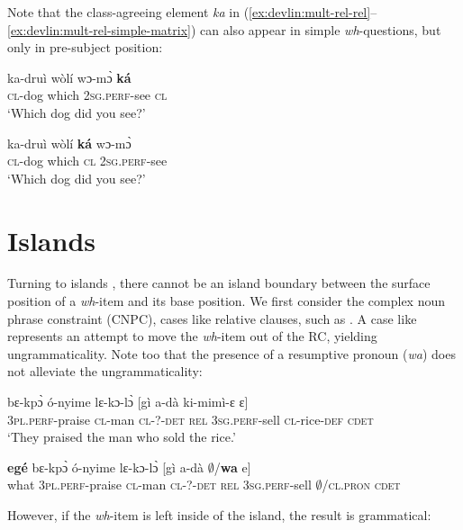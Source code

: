 \documentclass[output=paper]{langscibook}
\begin{document}
Note that the class-agreeing element \textit{ka} in (\ref{ex:devlin:mult-rel-rel}--\ref{ex:devlin:mult-rel-simple-matrix}) can also appear in simple \textit{wh}-questions, but only in pre-subject position:
\ea
\begin{xlist}
\ex %
\gll *ka-dru\`{i} w\`{o}l\'{i} wɔ-m\`{ɔ} \textbf{k\'{a}}\\
\textsc{cl}-dog which 2\textsc{sg.perf}-see \textsc{cl} \\
\glt `Which dog did you see?’

\ex %
\gll ka-dru\`{i} w\`{o}l\'{i} \textbf{k\'{a}} wɔ-m\`{ɔ}\\
\textsc{cl}-dog which \textsc{cl} 2\textsc{sg.perf}-see \\
\glt `Which dog did you see?’
\end{xlist}
\z


\section{Islands}
Turning to islands \citep{ross1967constraints}, there cannot be an island boundary between the surface position of a \textit{wh}-item and its base position. We first consider the complex noun phrase constraint (CNPC),  cases like relative clauses, such as .  A case like  represents an attempt to move the \textit{wh}-item out of the RC, yielding ungrammaticality. Note too that the presence of a resumptive pronoun (\textit{wa})  does not alleviate the ungrammaticality:


\ea \label{ex:devlin:cnpc}
\begin{xlist}
\ex \label{ex:devlin:cnpc-base}
\gll bɛ-kp\`{ɔ} \'{o}-nyime lɛ-kɔ-l\`{ɔ} [g\`{i} a-d\`{a} ki-mim\`{i}-ɛ ɛ]\\
3\textsc{pl.perf}-praise \textsc{cl}-man \textsc{cl-?-det} \textsc{rel} 3\textsc{sg.perf}-sell \textsc{cl}-rice-\textsc{def} \textsc{cdet}\\
\glt `They praised the man who sold the rice.’

\ex \label{ex:devlin:cnpc-move}
\gll *\textbf{eg\'{e}} bɛ-kp\`{ɔ} \'{o}-nyime lɛ-kɔ-l\`{ɔ} [g\`{i} a-d\`{a} $\emptyset$/\textbf{wa} e]\\
what 3\textsc{pl.perf}-praise \textsc{cl}-man	 \textsc{cl}-?-\textsc{det} \textsc{rel} 3\textsc{sg.perf}-sell $\emptyset$/\textsc{cl.pron} \textsc{cdet}\\
\glt 
\end{xlist}
\z

However, if the \textit{wh}-item is left inside of the island, the result is grammatical:
\end{document}
